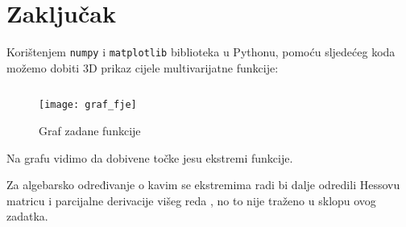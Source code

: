 \chapter{Zaključak}

Korištenjem \verb|numpy| i \verb|matplotlib| biblioteka u Pythonu, pomoću sljedećeg koda možemo dobiti 3D prikaz cijele multivarijatne funkcije:

\inputminted{python}{./code/graf_fje.py}

\begin{figure}
    \centering
    \texttt{[image: graf\_fje]}
    \caption{Graf zadane funkcije}
\end{figure}

Na grafu vidimo da dobivene točke jesu ekstremi funkcije.\par
Za algebarsko određivanje o kavim se ekstremima radi bi dalje odredili Hessovu matricu i parcijalne derivacije višeg reda \cite[][poglavlje 6.3]{ccalc}, no to nije traženo u sklopu ovog zadatka.

\newpage